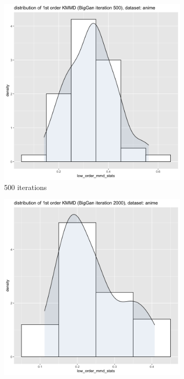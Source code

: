 \documentclass{article}
\begin{document}
\begin{figure}[h!]
    \caption{Dataset Anime}
     \centering
     \begin{subfigure}[b]{0.3\textwidth}
         \centering
         \includegraphics[width=\textwidth]{kmmd_figures/biggan_anime_lowdist_500.png}
         \caption{500 iterations}
     \end{subfigure}
     \hfill
     \begin{subfigure}[b]{0.3\textwidth}
         \centering
         \includegraphics[width=\textwidth]{kmmd_figures/biggan_anime_lowdist_2000.png}

\end{subfigure}
\end{figure}
\end{document}

